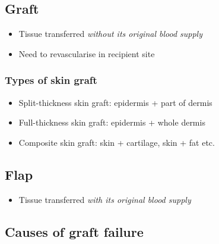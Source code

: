 \documentclass[
  14pt,
]{extarticle}
\providecommand{\tightlist}{%
  \setlength{\itemsep}{0pt}\setlength{\parskip}{0pt}}
\begin{document}
\hypertarget{graft}{%
\subsection{Graft}\label{graft}}

\begin{itemize}
\tightlist
\item
  Tissue transferred \emph{without its original blood supply}
\item
  Need to revascularise in recipient site
\end{itemize}

\hypertarget{types-of-skin-graft}{%
\subsubsection{Types of skin graft}\label{types-of-skin-graft}}

\begin{itemize}
\tightlist
\item
  Split-thickness skin graft: epidermis + part of dermis
\item
  Full-thickness skin graft: epidermis + whole dermis
\item
  Composite skin graft: skin + cartilage, skin + fat etc.
\end{itemize}

\hypertarget{flap}{%
\subsection{Flap}\label{flap}}

\begin{itemize}
\tightlist
\item
  Tissue transferred \emph{with its original blood supply}
\end{itemize}

\hypertarget{causes-of-graft-failure}{%
\subsection{Causes of graft failure}\label{causes-of-graft-failure}}
\end{document}
